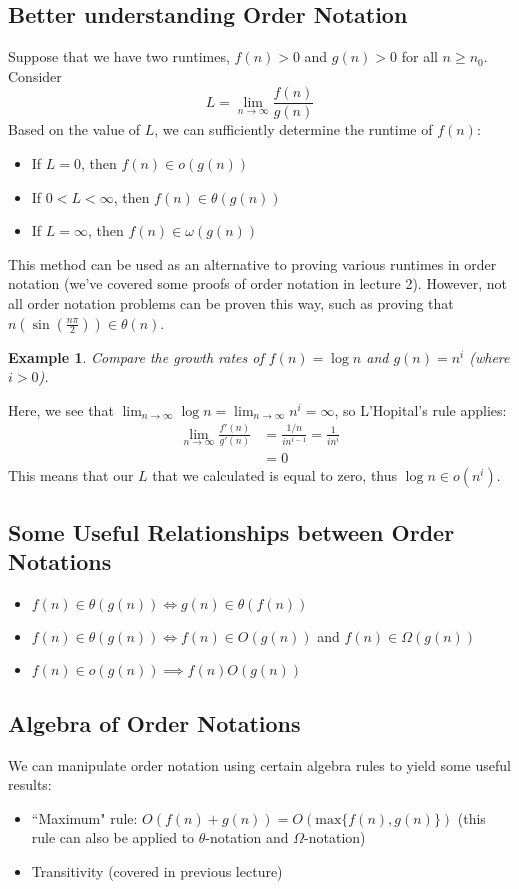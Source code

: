 \documentclass{report}
\newtheorem{ex}{Example}[section]
\begin{document}
\subsection{Better understanding Order Notation}
Suppose that we have two runtimes, $f(n) > 0$ and $g(n) > 0$ for all $n \geq n_0$. Consider
$$L = \lim_{n \to \infty} \frac{f(n)}{g(n)}$$
Based on the value of $L$, we can sufficiently determine the runtime of $f(n)$:
\begin{itemize}
\item If $L = 0$, then $f(n) \in o(g(n))$
\item If $0 < L < \infty$, then $f(n) \in \theta(g(n))$
\item If $L = \infty$, then $f(n) \in \omega(g(n))$
\end{itemize}
This method can be used as an alternative to proving various runtimes in order notation (we've covered some proofs of order notation in lecture 2). However, not all order notation problems can be proven this way, such as proving that $n(\sin(\frac{n \pi}{2})) \in \theta(n)$.
\begin{ex}
Compare the growth rates of $f(n) = \log n$ and $g(n) = n^i$ (where $i > 0$).
\end{ex}
\noindent Here, we see that $\displaystyle \lim_{n \to \infty} \log n = \lim_{n \to \infty} n^i = \infty$, so L'Hopital's rule applies:
\begin{align}
\lim_{n \to \infty} \frac{f'(n)}{g'(n)} &= \frac{1/n}{i n^{i-1}} = \frac{1}{i n^i}  \\
&= 0
\end{align}
This means that our $L$ that we calculated is equal to zero, thus $\log n \in o(n^i)$.
\subsection{Some Useful Relationships between Order Notations}
\begin{itemize}
\item $f(n) \in \theta(g(n)) \iff g(n) \in \theta(f(n))$
\item $f(n) \in \theta(g(n)) \iff f(n) \in O(g(n))$ and $f(n) \in \Omega(g(n))$
\item $f(n) \in o(g(n)) \implies f(n) O(g(n))$
\end{itemize}
\subsection{Algebra of Order Notations}
We can manipulate order notation using certain algebra rules to yield some useful results:
\begin{itemize}
\item ``Maximum" rule: $O(f(n) + g(n)) = O(\mathrm{max}\{f(n), g(n)\})$ (this rule can also be applied to $\theta$-notation and $\Omega$-notation)
\item Transitivity (covered in previous lecture)
\end{itemize}
\end{document}
